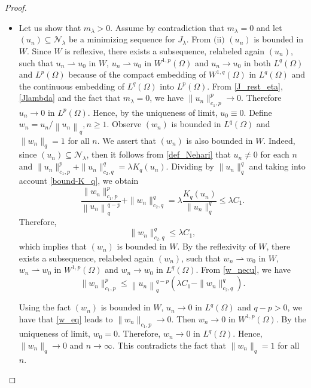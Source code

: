 \documentclass[10pt,a4paper]{amsart}
\begin{document}
\begin{proof}
\begin{itemize}
\item[(iii)] 
Let us show that $m_{\lambda} >0$. Assume by contradiction that $m_{\lambda}=0$ and let $\left(u_{n}\right) \subseteq \mathcal{N}_{\lambda}$ be a minimizing sequence for $J_{\lambda}$. From $\mbox{(ii)}$  $\left(u_{n}\right)$ is bounded in $W$. 
Since $W$ is reflexive, there exists a subsequence, relabeled again $(u_n)$, such that  $u_{n} \rightharpoonup u_{0}$  in $W$, $u_n\rightharpoonup u_{0}$ in $W^{1, p}(\Omega)$ and $u_{n} \rightarrow u_{0}$ in both $L^{q}(\Omega) $ and  $L^{p}(\Omega)$ because of  the compact embedding of $W^{1,q}(\Omega)$ in $ L^q(\Omega)$ and the continuous embedding of  $L^q(\Omega)$ into $L^p(\Omega)$.
From \eqref{J_rest_eta}, \eqref{Jlambda}  and the fact that $m_\lambda=0$, we have $\|u_n \|_{c_1,p}^p\rightarrow 0.$ Therefore $u_n\to 0 \mbox{ in } L^p({\Omega})$. Hence,  by the uniqueness of limit,  $u_{0} \equiv 0.$
Define $w_{n}=u_{n} /\left\|u_{n}\right\|_{ q}, n \geq 1$.  Observe  $(w_n)$ is bounded in $L^q(\Omega)$ and $\|w_n\|_q=1$ for all $n$. We assert that $\left(w_{n}\right)$ is also bounded in $W$.
Indeed, since $\left(u_{n}\right) \subseteq \mathcal{N}_{\lambda}$, then it follows from \eqref{def_Nehari}  that   $u_n\neq 0$ for each $n$ and $\|u_n\|_{c_1,p}^p+\|u_n \|_{c_2,q}^q=\lambda K_q(u_n)$.  Dividing by $\|u_n\|_q^q$ and taking into account \eqref{bound-K_q}, we obtain  
\begin{equation}\label{w_necu}
\frac{\|w_n \|_{c_1,p}^p}{\left\|u_{n}\right\|_{q}^{q-p}}+\|w_n \|_{c_2,q}^q=\lambda \frac{K_q(u_n)}{\|u_n\|_q^q} \leqslant \lambda C_1.
\end{equation}
Therefore, 
\begin{equation*}\label{w_bound}
    \|w_n \|_{c_2,q}^q\leqslant\lambda C_1,
\end{equation*}
which implies that $\left(w_{n}\right)$ is bounded in $W$. By the reflexivity of $W$, there exists a subsequence, relabeled again $(w_n)$, such that  $w_{n} \rightharpoonup w_{0}$  in $W$, $w_{n} \rightharpoonup w_{0}$ in $W^{1, p}(\Omega)$  and $w_{n} \rightarrow w_{0}$ in $L^{q}(\Omega).$   
From \eqref{w_necu}, we have 
\begin{equation}\label{w_eq}
    \|w_n \|_{c_1,p}^p\leqslant \left\|u_{n}\right\|_{q}^{q-p}(\lambda C_1- \|w_n \|_{c_2,q}^q).
\end{equation}

Using the fact $ (w_n )$ is bounded in $W$,  $u_{n} \rightarrow 0$ in $L^{q} (\Omega)$ and $q-p>0$, we have that \eqref{w_eq} leads to  $\|w_n \|_{c_1,p}\rightarrow 0.$ Then $w_n\rightarrow 0$ in $W^{1,p}(\Omega).$  By the uniqueness of limit, $w_0=0$. Therefore, $w_{n} \rightarrow 0$ in $L^{q}(\Omega)$. Hence, $\|w_n\|_q\to 0$ and $n\to \infty$.  This contradicts the fact that $\|w_n\|_q=1$ for all $n$.
\vspace{0.3cm}


\end{itemize}
\end{proof}
\end{document}
